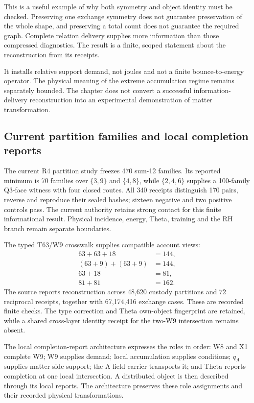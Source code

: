 This is a useful example of why both symmetry and object identity must be checked. Preserving one exchange symmetry does not guarantee preservation of the whole shape, and preserving a total count does not guarantee the required graph. Complete relation delivery supplies more information than those compressed diagnostics. The result is a finite, scoped statement about the reconstruction from its receipts.

It installs relative support demand, not joules and not a finite bounce-to-energy operator. The physical meaning of the extreme accumulation regime remains separately bounded. The chapter does not convert a successful information-delivery reconstruction into an experimental demonstration of matter transformation.

\subsection{Current partition families and local completion reports}

The current R4 partition study freezes 470 sum-12 families. Its reported minimum is 70 families over $\{3,9\}$ and $\{4,8\}$, while $\{2,4,6\}$ supplies a 100-family Q3-face witness with four closed routes. All 340 receipts distinguish 170 pairs, reverse and reproduce their sealed hashes; sixteen negative and two positive controls pass. The current authority retains strong contact for this finite informational result. Physical incidence, energy, Theta, training and the RH branch remain separate boundaries.\cite{viiatom}

The typed T63/W9 crosswalk supplies compatible account views:
\begin{align}
63+63+18&=144,\\
(63+9)+(63+9)&=144,\\
63+18&=81,\\
81+81&=162.
\end{align}
The source reports reconstruction across 48,620 custody partitions and 72 reciprocal receipts, together with 67,174,416 exchange cases. These are recorded finite checks. The type correction and Theta own-object fingerprint are retained, while a shared cross-layer identity receipt for the two-W9 intersection remains absent.

The local completion-report architecture expresses the roles in order: W8 and X1 complete W9; W9 supplies demand; local accumulation supplies conditions; $q_A$ supplies matter-side support; the A-field carrier transports it; and Theta reports completion at one local intersection. A distributed object is then described through its local reports. The architecture preserves these role assignments and their recorded physical transformations.


